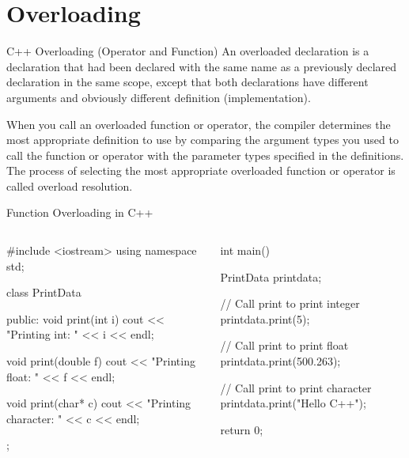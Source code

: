 \documentclass[../lecture5-objectorientation.tex]{subfiles}
\begin{document}
\section{Overloading}


\begin{frame}[fragile]{C++ Overloading (Operator and Function)}
    An overloaded declaration is a declaration that had been declared with the same name as a previously declared declaration in the same scope, except that both declarations have different arguments and obviously different definition (implementation).

    \note
    {
        When you call an overloaded function or operator, the compiler determines the most appropriate definition to use by comparing the argument types you used to call the function or operator with the parameter types specified in the definitions. The process of selecting the most appropriate overloaded function or operator is called overload resolution.
    }
\end{frame}


\begin{frame}[fragile]{Function Overloading in C++}
    \begin{columns}[T,onlytextwidth]
            \begin{cppcode}[lastline=21]
#include <iostream>
using namespace std;

class PrintData
{
    public:
        void print(int i)
        {
            cout << "Printing int: " << i << endl;
        }

        void print(double  f)
        {
            cout << "Printing float: " << f << endl;
        }

        void print(char* c)
        {
            cout << "Printing character: " << c << endl;
        }
};
            \end{cppcode}
            \begin{cppcode}[lastline=15]
int main()
{
    PrintData printdata;

    // Call print to print integer
    printdata.print(5);

    // Call print to print float
    printdata.print(500.263);

    // Call print to print character
    printdata.print("Hello C++");

    return 0;
}
            \end{cppcode}
    \end{columns}
\end{frame}

\end{document}
